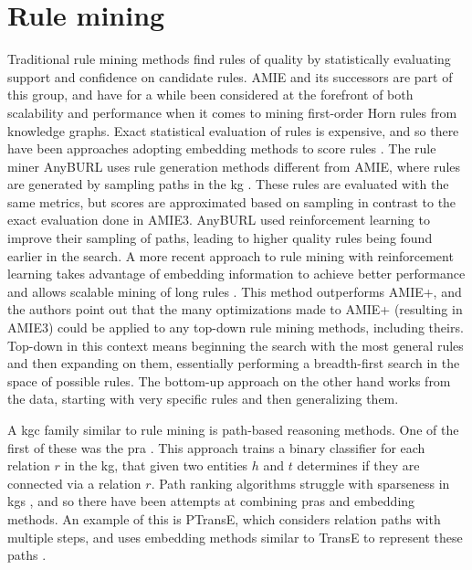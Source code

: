 \section{Rule mining}
Traditional rule mining methods find rules of quality by statistically evaluating support and confidence on candidate rules. AMIE and its successors are part of this group, and have for a while been considered at the forefront of both scalability and performance when it comes to mining first-order Horn rules from knowledge graphs. Exact statistical evaluation of rules is expensive, and so there have been approaches adopting embedding methods to score rules \cite{yang2014embedding, omran2018scalable, omran2019embedding}. The rule miner AnyBURL uses rule generation methods different from AMIE, where rules are generated by sampling paths in the \gls{kg} \cite{meilicke2020reinforced}. These rules are evaluated with the same metrics, but scores are approximated based on sampling in contrast to the exact evaluation done in AMIE3. AnyBURL used reinforcement learning to improve their sampling of paths, leading to higher quality rules being found earlier in the search. A more recent approach to rule mining with reinforcement learning takes advantage of embedding information to achieve better performance and allows scalable mining of long rules \cite{chen2022rule}. This method outperforms AMIE+, and the authors point out that the many optimizations made to AMIE+ (resulting in AMIE3) could be applied to any top-down rule mining methods, including theirs. Top-down in this context means beginning the search with the most general rules and then expanding on them, essentially performing a breadth-first search in the space of possible rules. The bottom-up approach on the other hand works from the data, starting with very specific rules and then generalizing them.

A \gls{kgc} family similar to rule mining is path-based reasoning methods. One of the first of these was the \gls{pra} \cite{lao2011random}. This approach trains a binary classifier for each relation $r$ in the \gls{kg}, that given two entities $h$ and $t$ determines if they are connected via a relation $r$. Path ranking algorithms struggle with sparseness in \glspl{kg} \cite{ma2019elpkg}, and so there have been attempts at combining \glspl{pra} and embedding methods. An example of this is PTransE, which considers relation paths with multiple steps, and uses embedding methods similar to TransE to represent these paths \cite{lin2015modeling}.  %


